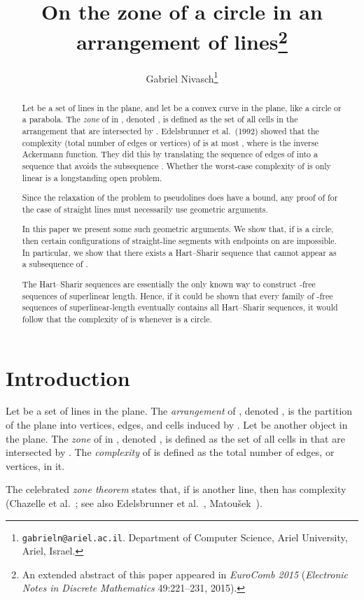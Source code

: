 \documentclass[11pt]{article}
\date{}
\author{Gabriel Nivasch\footnote{\texttt{gabrieln@ariel.ac.il}. Department of Computer Science, Ariel University, Ariel, Israel.}}
\title{On the zone of a circle in an arrangement of lines\footnote{An extended abstract of this paper appeared in \emph{EuroComb 2015} (\emph{Electronic Notes in Discrete Mathematics} 49:221--231, 2015).}}
\theoremstyle{definition}
\theoremstyle{remark}
\begin{document}
\maketitle

\begin{abstract}
Let  be a set of  lines in the plane, and let  be a convex curve in the plane, like a circle or a parabola. The \emph{zone} of  in , denoted , is defined as the set of all cells in the arrangement  that are intersected by . Edelsbrunner et al.~(1992) showed that the complexity (total number of edges or vertices) of  is at most , where  is the inverse Ackermann function. They did this by translating the sequence of edges of  into a sequence  that avoids the subsequence . Whether the worst-case complexity of  is only linear is a longstanding open problem.

Since the relaxation of the problem to pseudolines does have a  bound, any proof of  for the case of straight lines must necessarily use geometric arguments.

In this paper we present some such geometric arguments. We show that, if  is a circle, then certain configurations of straight-line segments with endpoints on  are impossible. In particular, we show that there exists a Hart--Sharir sequence that cannot appear as a subsequence of .

The Hart--Sharir sequences are essentially the only known way to construct -free sequences of superlinear length. Hence, if it could be shown that every family of -free sequences of superlinear-length eventually contains all Hart--Sharir sequences, it would follow that the complexity of  is  whenever  is a circle.
\end{abstract}

\section{Introduction}

Let  be a set of  lines in the plane. The \emph{arrangement} of , denoted , is the partition of the plane into vertices, edges, and cells induced by . Let  be another object in the plane. The \emph{zone} of  in , denoted , is defined as the set of all cells in  that are intersected by . The \emph{complexity} of  is defined as the total number of edges, or vertices, in it.

The celebrated \emph{zone theorem} states that, if  is another line, then  has complexity  (Chazelle et al.~\cite{CGL}; see also Edelsbrunner et al.~\cite{EGPPSS}, Matou\v sek~\cite{mat_DG}).
\end{document}
